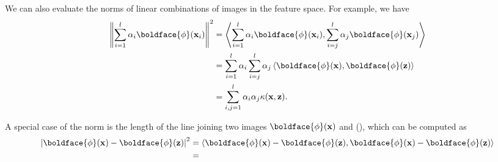 We can also evaluate the norms of linear combinations of images in the feature space. For example, we have 
\begin{align*}
	\left\|\sum_{i=1}^l\alpha_i\boldface{\phi}(\rvx_i)\right\|^2 &= \left<\sum_{i=1}^l\alpha_i\boldface{\phi}(\rvx_i), \sum_{i=j}^l\alpha_j\boldface{\phi}(\rvx_j)\right>\\
																 &=\sum_{i=1}^l\alpha_i\sum_{i=j}^l\alpha_j \left<\boldface{\phi}(\rvx), \boldface{\phi}(\rvz)\right>\\
																 &= \sum_{i,j=1}^l \alpha_i\alpha_j \kappa(\rvx, \rvz). 
\end{align*}

A special case of the norm is the length of the line joining two images $\boldface{\phi}(\rvx)$ and \boldface{\phi}(\rvz), which can be computed as
\begin{align*}
	\left|\boldface{\phi}(\rvx)-\boldface{\phi}(\rvz)\right|^2 &= \left<\boldface{\phi}(\rvx)-\boldface{\phi}(\rvz), \boldface{\phi}(\rvx)-\boldface{\phi}(\rvz)\right>\\
															   &= 
\end{align*}






